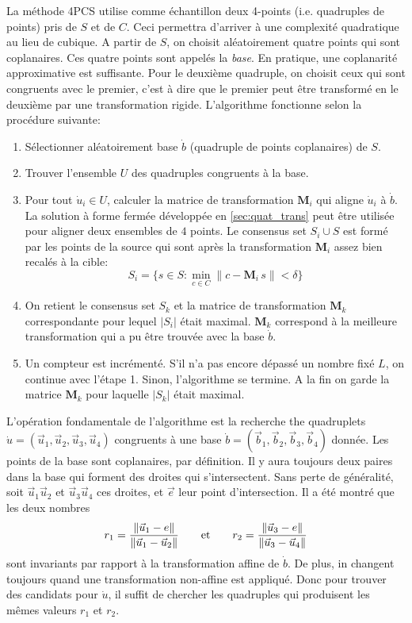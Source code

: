 \documentclass[a4paper,10pt]{scrreprt}
\begin{document}
La méthode 4PCS utilise comme échantillon deux 4-points (i.e. quadruples de points) pris de $S$ et de $C$. Ceci permettra d'arriver à une complexité quadratique au lieu de cubique. A partir de $S$, on choisit aléatoirement quatre points qui sont coplanaires. Ces quatre points sont appelés la \emph{base}. En pratique, une coplanarité approximative est suffisante. Pour le deuxième quadruple, on choisit ceux qui sont congruents avec le premier, c'est à dire que le premier peut être transformé en le deuxième par une transformation rigide. L'algorithme fonctionne selon la procédure suivante:
\begin{enumerate}
	\item Sélectionner aléatoirement base $\dot{b}$ (quadruple de points coplanaires) de $S$.
	\item Trouver l'ensemble $U$ des quadruples congruents à la base.
	\item Pour tout $\dot{u}_i \in U$, calculer la matrice de transformation $\mathbf{M}_i$ qui aligne $\dot{u}_i$ à $\dot{b}$. La solution à forme fermée développée en \ref{sec:quat_trans} peut être utilisée pour aligner deux ensembles de $4$ points. Le consensus set $S_i \cup S$ est formé par les points de la source qui sont après la transformation $\mathbf{M}_i$ assez bien recalés à la cible:
		\begin{equation*}
			S_i = \{ s \in S : \min_{c \in C} \| c - \mathbf{M}_i \, s \| < \delta \}
		\end{equation*}
	\item On retient le consensus set $S_k$ et la matrice de transformation $\mathbf{M}_k$ correspondante pour lequel $|S_i|$ était maximal. $\mathbf{M}_k$ correspond à la meilleure transformation qui a pu être trouvée avec la base $\dot{b}$.
	\item Un compteur est incrémenté. S'il n'a pas encore dépassé un nombre fixé $L$, on continue avec l'étape 1. Sinon, l'algorithme se termine. A la fin on garde la matrice $\mathbf{M}_k$ pour laquelle $|S_k|$ était maximal.
\end{enumerate}

L'opération fondamentale de l'algorithme est la recherche the quadruplets $\dot{u} = (\vec{u}_1, \vec{u}_2, \vec{u}_3, \vec{u}_4)$ congruents à une base $\dot{b} = (\vec{b}_1, \vec{b}_2, \vec{b}_3, \vec{b}_4)$ donnée. Les points de la base sont coplanaires, par définition. Il y aura toujours deux paires dans la base qui forment des droites qui s'intersectent. Sans perte de généralité, soit $\vec{u}_1 \vec{u}_2$ et $\vec{u}_3 \vec{u}_4$ ces droites, et $\vec{e}$ leur point d'intersection. Il a été montré que les deux nombres
\begin{equation*}
	r_1 = \frac{\| \vec{u}_1 - e \|}{\| \vec{u}_1 - \vec{u}_2 \|}
	\hspace{7mm} \text{et} \hspace{7mm}
	r_2 = \frac{\| \vec{u}_3 - e \|}{\| \vec{u}_3 - \vec{u}_4 \|}
\end{equation*}
sont invariants par rapport à la transformation affine de $\dot{b}$. De plus, in changent toujours quand une transformation non-affine est appliqué. Donc pour trouver des candidats pour $\dot{u}$, il suffit de chercher les quadruples qui produisent les mêmes valeurs $r_1$ et $r_2$.
\end{document}
